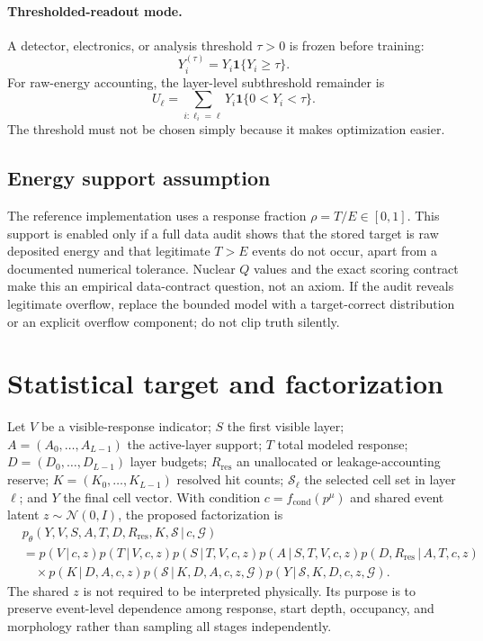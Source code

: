 \documentclass[11pt]{article}
\theoremstyle{definition}
\theoremstyle{remark}
\newcommand{\pM}{p_{\theta}}
\newcommand{\G}{\mathcal{G}}
\newcommand{\given}{\,\vert\,}
\newcommand{\ind}{\mathbf{1}}
\begin{document}
\paragraph{Thresholded-readout mode.}
A detector, electronics, or analysis threshold $\tau>0$ is frozen before training:
\begin{equation}
  Y_i^{(\tau)}=Y_i\ind\{Y_i\ge\tau\}.
  \label{eq:threshold_target}
\end{equation}
For raw-energy accounting, the layer-level subthreshold remainder is
\begin{equation}
  U_\ell=\sum_{i:\ell_i=\ell}Y_i\ind\{0<Y_i<\tau\}.
\end{equation}
The threshold must not be chosen simply because it makes optimization easier.

\subsection{Energy support assumption}
The reference implementation uses a response fraction $\rho=T/E\in[0,1]$. This support is enabled only if a full data audit shows that the stored target is raw deposited energy and that legitimate $T>E$ events do not occur, apart from a documented numerical tolerance. Nuclear $Q$ values and the exact scoring contract make this an empirical data-contract question, not an axiom. If the audit reveals legitimate overflow, replace the bounded model with a target-correct distribution or an explicit overflow component; do not clip truth silently.

\section{Statistical target and factorization}

Let $V$ be a visible-response indicator; $S$ the first visible layer; $A=(A_0,\ldots,A_{L-1})$ the active-layer support; $T$ total modeled response; $D=(D_0,\ldots,D_{L-1})$ layer budgets; $R_{\mathrm{res}}$ an unallocated or leakage-accounting reserve; $K=(K_0,\ldots,K_{L-1})$ resolved hit counts; $\mathcal S_\ell$ the selected cell set in layer $\ell$; and $Y$ the final cell vector. With condition $c=f_{\mathrm{cond}}(p^\mu)$ and shared event latent $z\sim\mathcal N(0,I)$, the proposed factorization is
\begin{align}
&\pM(Y,V,S,A,T,D,R_{\mathrm{res}},K,\mathcal S\given c,\G) \nonumber\\
&=p(V\given c,z)
  p(T\given V,c,z)
  p(S\given T,V,c,z)
  p(A\given S,T,V,c,z)
  p(D,R_{\mathrm{res}}\given A,T,c,z) \nonumber\\
&\quad\times p(K\given D,A,c,z)
  p(\mathcal S\given K,D,A,c,z,\G)
  p(Y\given\mathcal S,K,D,c,z,\G).
  \label{eq:factorization}
\end{align}
The shared $z$ is not required to be interpreted physically. Its purpose is to preserve event-level dependence among response, start depth, occupancy, and morphology rather than sampling all stages independently.
\end{document}
